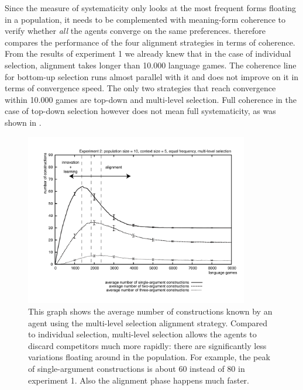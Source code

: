 Since the measure of systematicity only looks at the most frequent forms floating in a population, it needs to be complemented with meaning-form coherence to verify whether {\em all} the agents converge on the same preferences.  therefore compares the performance of the four alignment strategies in terms of coherence. From the results of experiment 1 we already knew that in the case of individual selection, alignment takes longer than 10.000 language games. The coherence line for bottom-up selection runs almost parallel with it and does not improve on it in terms of convergence speed. The only two strategies that reach convergence within 10.000 games are top-down and multi-level selection. Full coherence in the case of top-down selection however does not mean full systematicity, as was shown in .

\begin{figure}[t]
\centerline{\includegraphics[width=0.87\textwidth]{Chapter4/figs/size2d}}
  \caption[Experiment 2: number of constructions with multi-level selection]{This graph shows the average number of constructions known by an agent using the multi-level selection alignment strategy. Compared to individual selection, multi-level selection allows the agents to discard competitors much more rapidly: there are significantly less variations floating around in the population. For example, the peak of single-argument constructions is about 60 instead of 80 in experiment 1. Also the alignment phase happens much faster.}
   \label{f:size2d}
\end{figure}



